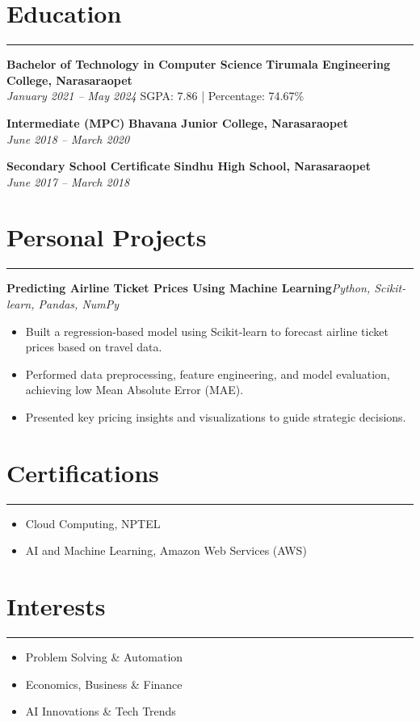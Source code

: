 \documentclass[12pt]{article}
\newenvironment{project}[1]
  {\par\textbf{#1}\hfill\textit{Python, Scikit-learn, Pandas, NumPy}\vspace{1pt}\begin{itemize}}
  {\end{itemize}\vspace{2pt}}
\begin{document}
\section*{Education}
\vspace{1pt}\hrule\vspace{4pt}
\textbf{Bachelor of Technology in Computer Science} \hfill \textbf{Tirumala Engineering College, Narasaraopet} \\
\textit{January 2021 -- May 2024} \quad SGPA: 7.86 | Percentage: 74.67\%

\textbf{Intermediate (MPC)} \hfill \textbf{Bhavana Junior College, Narasaraopet} \\
\textit{June 2018 -- March 2020}

\textbf{Secondary School Certificate} \hfill \textbf{Sindhu High School, Narasaraopet} \\
\textit{June 2017 -- March 2018}

\vspace{6pt}

\section*{Personal Projects}
\vspace{1pt}\hrule\vspace{4pt}
\begin{project}{Predicting Airline Ticket Prices Using Machine Learning}
  \item Built a regression-based model using Scikit-learn to forecast airline ticket prices based on travel data.
  \item Performed data preprocessing, feature engineering, and model evaluation, achieving low Mean Absolute Error (MAE).
  \item Presented key pricing insights and visualizations to guide strategic decisions.
\end{project}

\section*{Certifications}
\vspace{1pt}\hrule\vspace{4pt}
\begin{itemize}
  \item Cloud Computing, NPTEL
  \item AI and Machine Learning, Amazon Web Services (AWS)
\end{itemize}

\section*{Interests}
\vspace{1pt}\hrule\vspace{4pt}
\begin{itemize}
  \item Problem Solving \& Automation
  \item Economics, Business \& Finance
  \item AI Innovations \& Tech Trends
\end{itemize}
\end{document}
